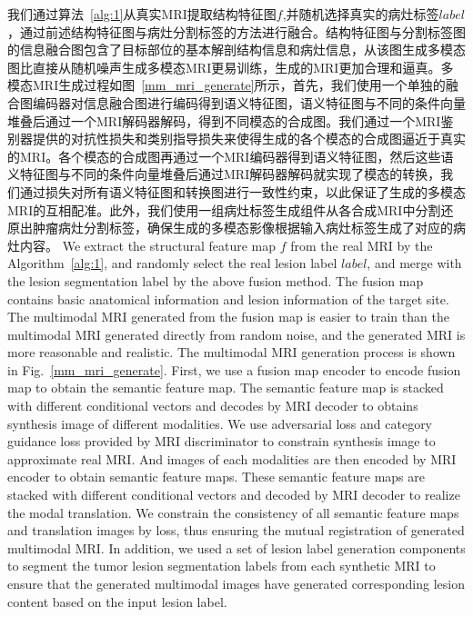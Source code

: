 \documentclass[letterpaper]{article} %
\begin{document}
我们通过算法~\ref{alg:1}从真实MRI提取结构特征图$f$,并随机选择真实的病灶标签$label$，通过前述结构特征图与病灶分割标签的方法进行融合。结构特征图与分割标签图的信息融合图包含了目标部位的基本解剖结构信息和病灶信息，从该图生成多模态图比直接从随机噪声生成多模态MRI更易训练，生成的MRI更加合理和逼真。多模态MRI生成过程如图~\ref{mm_mri_generate}所示，首先，我们使用一个单独的融合图编码器对信息融合图进行编码得到语义特征图，语义特征图与不同的条件向量堆叠后通过一个MRI解码器解码，得到不同模态的合成图。我们通过一个MRI鉴别器提供的对抗性损失和类别指导损失来使得生成的各个模态的合成图逼近于真实的MRI。各个模态的合成图再通过一个MRI编码器得到语义特征图，然后这些语义特征图与不同的条件向量堆叠后通过MRI解码器解码就实现了模态的转换，我们通过损失对所有语义特征图和转换图进行一致性约束，以此保证了生成的多模态MRI的互相配准。此外，我们使用一组病灶标签生成组件从各合成MRI中分割还原出肿瘤病灶分割标签，确保生成的多模态影像根据输入病灶标签生成了对应的病灶内容。
We extract the structural feature map $f$ from the real MRI by the Algorithm~\ref{alg:1}, and randomly select the real lesion label $label$, and merge with the lesion segmentation label by the above fusion method. The fusion map contains basic anatomical information and lesion information of the target site. The multimodal MRI generated from the fusion map is easier to train than the multimodal MRI generated directly from random noise, and the generated MRI is more reasonable and realistic. The multimodal MRI generation process is shown in Fig.~\ref{mm_mri_generate}. First, we use a fusion map encoder to encode fusion map to obtain the semantic feature map. The semantic feature map is stacked with different conditional vectors and decodes by MRI decoder to obtains synthesis image of different modalities. We use adversarial loss and category guidance loss provided by MRI discriminator to constrain synthesis image to approximate real MRI. And images of each modalities are then encoded by MRI encoder to obtain semantic feature maps. These semantic feature maps are stacked with different conditional vectors and decoded by MRI decoder to realize the modal translation. We constrain the consistency of all semantic feature maps and translation images by loss, thus ensuring the mutual registration of generated multimodal MRI. In addition, we used a set of lesion label generation components to segment the tumor lesion segmentation labels from each synthetic MRI to ensure that the generated multimodal images have generated corresponding lesion content based on the input lesion label.
\end{document}
